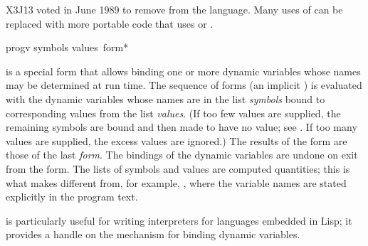 \begin{newer}
X3J13 voted in June 1989  to remove
 from the language.  Many uses of 
can be replaced with more portable code that uses 
or .
\end{newer}

\goodbreak

\begin{defspec}
progv symbols values {\,form}*

 is a special form that allows binding one or more dynamic
variables whose names may be determined at run time.  The sequence of
forms (an implicit )
is evaluated with the dynamic variables whose names are in the list
\emph{symbols} bound to corresponding values from the list \emph{values}.
(If too few values are supplied, the remaining symbols are bound and then
made to have no value; see .  If too many values are
supplied, the excess values are ignored.)  The results of the 
form are those of the last
\emph{form}.  The bindings of the dynamic variables are undone on
exit from the  form.  The lists of symbols and values are
computed quantities; this is what makes  different from, for
example, , where the variable names are stated explicitly in
the program text.

 is particularly useful for writing interpreters for languages
embedded in Lisp; it provides a handle on the mechanism for binding
dynamic variables.
\end{defspec}

